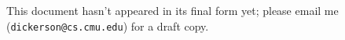 

This document hasn't appeared in its final form yet; please email me (\texttt{dickerson@cs.cmu.edu}) for a draft copy.


